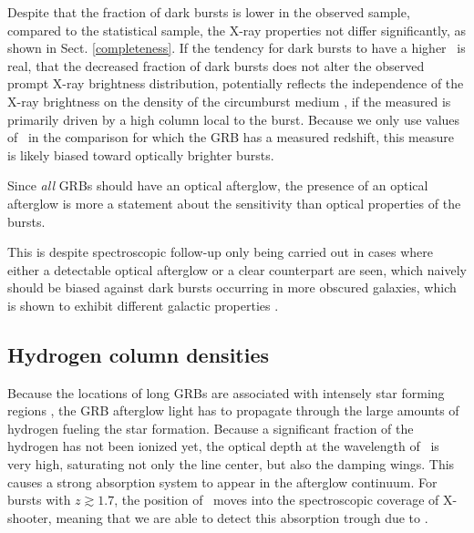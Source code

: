 \documentclass{aa}    %
\begin{document}
Despite that the fraction of dark bursts is lower in the observed sample,
compared to the statistical sample, the X-ray properties not differ
significantly, as shown in Sect. \ref{completeness}. If the tendency for dark
bursts to have a higher \nhx~is real, that the decreased fraction of dark bursts
does not alter the observed prompt X-ray brightness distribution, potentially
reflects the independence of the X-ray brightness on the density of the
circumburst medium \citep{Freedman2001, Berger2003, Nysewander2009}, if the
measured \nhx is primarily driven by a high column local to the burst. Because we
only use values of \nhx~in the comparison for which the GRB has a measured
redshift, this measure is likely biased toward optically brighter bursts.

Since \textit{all} GRBs should have an optical afterglow, the presence of an
optical afterglow is more a statement about the sensitivity than optical
properties of the bursts. 


This is despite spectroscopic follow-up only being carried out in cases where
either a detectable optical afterglow or a clear counterpart are seen, which
naively should be biased against dark bursts occurring in more obscured
galaxies, which is shown to exhibit different galactic properties
\citep{Perley2009, Kruhler2011, Rossi2012, Perley2013b, Perley2015b}.


\subsection{Hydrogen column densities}

Because the locations of long GRBs are associated with intensely star forming regions
\citep{Hogg1999, Bloom2002, Fruchter2006}, the GRB afterglow light has to
propagate through the large amounts of hydrogen fueling the star formation.
Because a significant fraction of the hydrogen has not been ionized yet, the
optical depth at the wavelength of \lya~is very high, saturating not only the
line center, but also the damping wings. This causes a strong absorption system
to appear in the afterglow continuum. For bursts with $z \gtrsim 1.7$, the
position of \lya~moves into the spectroscopic coverage of X-shooter, meaning
that we are able to detect this absorption trough due to \lya.
\end{document}
